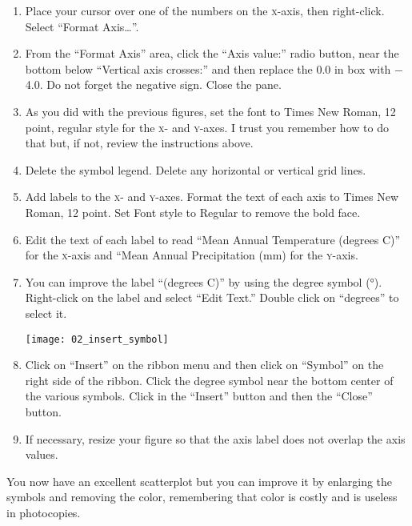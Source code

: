\documentclass[12pt, hidelinks]{exam}
\newcommand*\axis[1]{{\scshape #1}-axis}
\begin{document}
\begin{questions}
\begin{enumerate}[resume]
	\item Place your cursor over one of the numbers on the \axis{x}, then right-click. Select “Format Axis\dots”.

	\item From the “Format Axis” area, click the “Axis value:” radio button, near the bottom below “Vertical axis crosses:” and then replace the 0.0 in box with $-$4.0. Do not forget the negative sign. Close the pane.

	\item As you did with the previous figures, set the font to Times New Roman, 12 point, regular style for the \textsc{x}- and \textsc{y}-axes. I trust you remember how to do that but, if not, review the instructions above.
	
	\item Delete the symbol legend. Delete any horizontal or vertical grid lines.

	\item Add labels to the \textsc{x}- and \textsc{y}-axes. Format the text of each axis to Times New Roman, 12 point. Set Font style to Regular to remove the bold face.

	\item Edit the text of each label to read “Mean Annual Temperature (degrees C)” for the \axis{x} and “Mean Annual Precipitation (mm) for the \axis{y}.

	\item You can improve the label “(degrees C)” by using the degree symbol (°). Right-click on the label and select “Edit Text.” Double click on “degrees” to select it.

\begin{center}
	\texttt{[image: 02\_insert\_symbol]}
\end{center}

	\item Click on “Insert” on the ribbon menu and then click on “Symbol” on the right side of the ribbon. Click the degree symbol near the bottom center of the various symbols. Click in the “Insert” button and then the “Close” button. 
	
	\item If necessary, resize your figure so that the axis label does not overlap the axis values.
\end{enumerate}
 
You now have an excellent scatterplot but you can improve it by enlarging the symbols and removing the color, remembering that color is costly and is useless in photocopies.


\end{questions}
\end{document}
